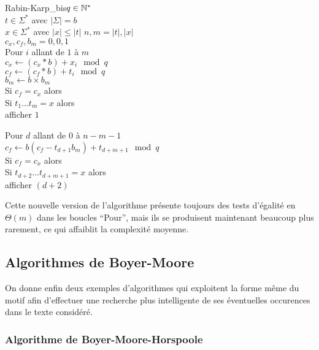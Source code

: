 		\begin{algo}{Rabin-Karp\_bis}{\(q\in\mathbb{N}^*\) \\ \aentspace \(t\in\Sigma^*\) avec \(|\Sigma|=b\) \\ \aentspace \(x\in\Sigma^*\) avec \(|x| \leq |t|\)}{}{}
			\(n,m = |t|, |x|\) \\
			\(c_x, c_f, b_m = 0,0,1\) \\
			Pour \(i\) allant de \(1\) à \(m\) \\ \Indp
				\(c_x \gets (c_x * b) + x_i \mod{q}\) \\
				\(c_f \gets (c_f * b) + t_i \mod{q}\) \\
				\(b_m \gets b \times b_m\) \\ \Indm
			Si \(c_f = c_x\) alors \\ \Indp
				Si \(t_1...t_{m} = x\) alors \\ \Indp
					afficher \(1\) \\ \Indm \Indm
		\end{algo}
		
		\begin{algocont}
			Pour \(d\) allant de \(0\) à \(n-m-1\) \\ \Indp
			\(c_f \gets b(c_f - t_{d+1}b_m) + t_{d+m+1} \mod{q}\) \\
			Si \(c_f = c_x\) alors \\ \Indp
			Si \(t_{d+2}...t_{d+m+1} = x\) alors \\ \Indp
			afficher \((d+2)\) \\ \Indm \Indm
		\end{algocont}
		
		Cette nouvelle version de l'algorithme présente toujours des tests d'égalité en \(\Theta(m)\) dans les boucles ``Pour'', mais ils se produisent maintenant beaucoup plus rarement, ce qui affaiblit la complexité moyenne.
		
	\subsection{Algorithmes de Boyer-Moore}
		
		On donne enfin deux exemples d'algorithmes qui exploitent la forme même du motif afin d'effectuer une recherche plus intelligente de ses éventuelles occurences dans le texte considéré.
		
		\subsubsection{Algorithme de Boyer-Moore-Horspoole}
		
